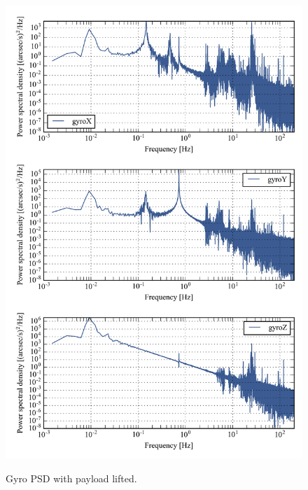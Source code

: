\begin{figure}[!h]
\begin{center}
\includegraphics{Figures/lifted_400.png}
\label{fig:multiPSD400_lifted}
\vspace{-0.5cm}
\caption[Gyro PSD with payload lifted]{Gyro PSD with payload lifted.}
\end{center}
\end{figure}


